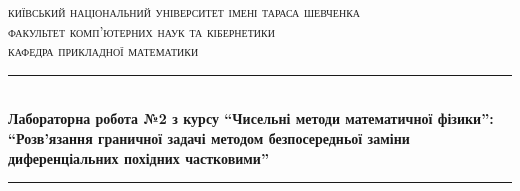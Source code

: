 
\setlength\parindent{0pt} %



\begin{titlepage}

\newcommand{\HRule}{\rule{\linewidth}{0.5mm}} %

\center %
 

\textsc{\Large київський національний університет імені тараса шевченка}\\[1.5cm] %
\textsc{\large факультет комп'ютерних наук та кібернетики}\\[0.5cm] %
\textsc{\large кафедра прикладної математики}\\[0.5cm] %


\HRule \\[0.4cm]
{ \Large \bfseries Лабораторна робота №2 з курсу “Чисельні методи математичної фізики”:}\\[0.4cm] %
{ \Large \bfseries “Розв'язання граничної задачі методом безпосередньої заміни диференціальних похідних частковими” }
\HRule \\[1.5cm]
 


\end{titlepage}
